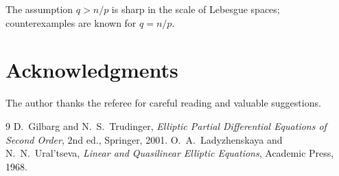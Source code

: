 \begin{remark}
The assumption $q>n/p$ is sharp in the scale of Lebesgue spaces;
counterexamples are known for $q=n/p$.
\end{remark}

\section*{Acknowledgments}
The author thanks the referee for careful reading and valuable suggestions.

\begin{thebibliography}{9}
 D.~Gilbarg and N.~S.~Trudinger, \emph{Elliptic Partial Differential
  Equations of Second Order}, 2nd ed., Springer, 2001.
 O.~A.~Ladyzhenskaya and N.~N.~Ural'tseva, \emph{Linear and Quasilinear
  Elliptic Equations}, Academic Press, 1968.
\end{thebibliography}


